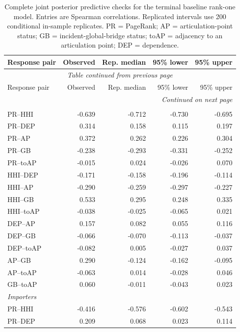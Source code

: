 \documentclass[pdftex,12pt,openright,a4paper,oneside]{book}
\begin{document}
\begin{longtable}{lrrrr}
\caption{Complete joint posterior predictive checks for the terminal baseline rank-one model. Entries are Spearman correlations. Replicated intervals use 200 conditional in-sample replicates. PR = PageRank; AP = articulation-point status; GB = incident-global-bridge status; toAP = adjacency to an articulation point; DEP = dependence.}
\label{tab:joint_ppc_full}\\
\toprule
Response pair & Observed & Rep. median & 95\% lower & 95\% upper \\
\midrule
\endfirsthead
\multicolumn{5}{c}{\textit{Table continued from previous page}}\\
\toprule
Response pair & Observed & Rep. median & 95\% lower & 95\% upper \\
\midrule
\endhead
\midrule
\multicolumn{5}{r}{\textit{Continued on next page}}\\
\endfoot
\bottomrule
\endlastfoot
\multicolumn{5}{l}{\textit{All terminals}}\\
\midrule
PR--HHI & -0.639 & -0.712 & -0.730 & -0.695 \\
PR--DEP & 0.314 & 0.158 & 0.115 & 0.197 \\
PR--AP & 0.372 & 0.262 & 0.226 & 0.304 \\
PR--GB & -0.238 & -0.293 & -0.331 & -0.252 \\
PR--toAP & -0.015 & 0.024 & -0.026 & 0.070 \\
HHI--DEP & -0.171 & -0.158 & -0.196 & -0.114 \\
HHI--AP & -0.290 & -0.259 & -0.297 & -0.227 \\
HHI--GB & 0.533 & 0.295 & 0.248 & 0.335 \\
HHI--toAP & -0.038 & -0.025 & -0.065 & 0.021 \\
DEP--AP & 0.157 & 0.082 & 0.055 & 0.116 \\
DEP--GB & -0.066 & -0.070 & -0.113 & -0.037 \\
DEP--toAP & -0.082 & 0.005 & -0.027 & 0.037 \\
AP--GB & 0.290 & -0.124 & -0.162 & -0.095 \\
AP--toAP & -0.063 & 0.014 & -0.028 & 0.046 \\
GB--toAP & 0.060 & -0.011 & -0.043 & 0.023 \\
\midrule
\multicolumn{5}{l}{\textit{Importers}}\\
\midrule
PR--HHI & -0.416 & -0.576 & -0.602 & -0.543 \\
PR--DEP & 0.209 & 0.068 & 0.023 & 0.114 \\

\end{longtable}
\end{document}
